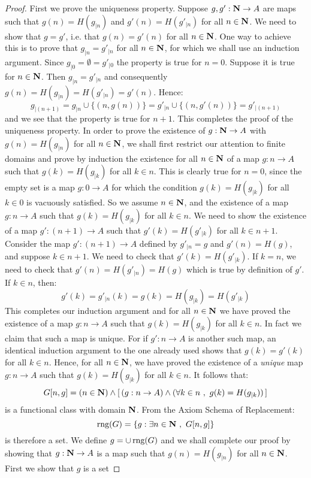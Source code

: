 \begin{proof}
First we prove the uniqueness property. Suppose $g,g':\mbox{$\bf N$}\to A$ are
maps such that $g(n)=H(g_{|n})$ and $g'(n)=H(g'_{|n})$ for all
$n\in\mbox{$\bf N$}$. We need to show that $g=g'$, i.e. that $g(n)=g'(n)$ for
all $n\in\mbox{$\bf N$}$. One way to achieve this is to prove that
$g_{|n}=g'_{|n}$ for all $n\in\mbox{$\bf N$}$, for which we shall use an
induction argument. Since $g_{|0}=\emptyset=g'_{|0}$ the property is
true for $n=0$. Suppose it is true for $n\in\mbox{$\bf N$}$. Then
$g_{|n}=g'_{|n}$ and consequently $g(n)=H(g_{|n})=H(g'_{|n}) =
g'(n)$. Hence:
    \[
    g_{|(n+1)}=g_{|n}\cup\{(n,g(n))\}=g'_{|n}\cup\{(n,g'(n))\}=g'_{|(n+1)}
    \]
and we see that the property is true for $n+1$. This completes the
proof of the uniqueness property. In order to prove the existence of
$g:\mbox{$\bf N$}\to A$ with $g(n)=H(g_{|n})$ for all $n\in\mbox{$\bf N$}$, we shall first
restrict our attention to finite domains and prove by induction the
existence for all $n\in\mbox{$\bf N$}$ of a map $g:n\to A$ such that
$g(k)=H(g_{|k})$ for all $k\in n$. This is clearly true for $n=0$,
since the empty set is a map $g:0\to A$ for which the condition
$g(k)=H(g_{|k})$ for all $k\in 0$ is vacuously satisfied. So we
assume $n\in \mbox{$\bf N$}$, and the existence of a map $g:n\to A$ such that
$g(k)=H(g_{|k})$ for all $k\in n$. We need to show the existence of
a map $g':(n+1)\to A$ such that $g'(k)=H(g'_{|k})$ for all $k\in
n+1$. Consider the map $g':(n+1)\to A$ defined by $g'_{|n}=g$ and
$g'(n)=H(g)$, and suppose $k\in n+1$. We need to check that
$g'(k)=H(g'_{|k})$. If $k=n$, we need to check that
$g'(n)=H(g'_{|n})=H(g)$ which is true by definition of $g'$. If
$k\in n$, then:
    \[
    g'(k)=g'_{|n}(k)=g(k)=H(g_{|k})=H(g'_{|k})
    \]
This completes our induction argument and for all $n\in\mbox{$\bf N$}$ we have
proved the existence of a map $g:n\to A$ such that $g(k)=H(g_{|k})$
for all $k\in n$. In fact we claim that such a map is unique. For if
$g':n\to A$ is another such map, an identical induction argument to
the one already used shows that $g(k)=g'(k)$ for all $k\in n$.
Hence, for all $n\in\mbox{$\bf N$}$, we have proved the existence of a {\em
unique} map $g:n\to A$ such that $g(k)=H(g_{|k})$ for all $k\in n$.
It follows that:
    \[
    G[n,g]=(n\in\mbox{$\bf N$})\land[\,(g:n\to A)\land(\forall k\in n\ ,\ g(k)=H(g_{|k}))\,]
    \]
is a functional class with domain $\mbox{$\bf N$}$. From the Axiom Schema of
Replacement:
    \[
    \rng(G)=\{g:\exists n\in\N\ ,\ G[n,g]\}
    \]
is therefore a set. We define $g=\cup\,\mbox{\rm rng}(G)$ and we shall
complete our proof by showing that $g:\mbox{$\bf N$}\to A$ is a map such that
$g(n)=H(g_{|n})$ for all $n\in\mbox{$\bf N$}$. First we show that $g$ is a set

\end{proof}
